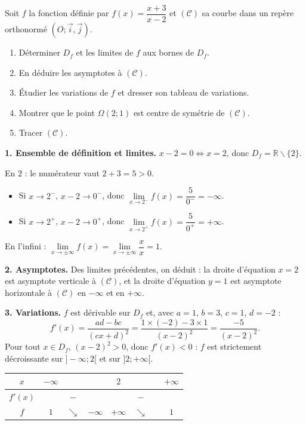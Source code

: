 \documentclass[11pt]{article}
\def\setminus{\mathbin{\backslash}}\let\smallsetminus\setminus
\begin{document}
\begin{exoresolu}
Soit $f$ la fonction définie par $f(x)=\dfrac{x+3}{x-2}$ et $(\mathcal{C})$ sa courbe dans un repère orthonormé $(O;\vec{i},\vec{j})$.
\begin{enumerate}
\item Déterminer $D_f$ et les limites de $f$ aux bornes de $D_f$.
\item En déduire les asymptotes à $(\mathcal{C})$.
\item Étudier les variations de $f$ et dresser son tableau de variations.
\item Montrer que le point $\Omega(2;1)$ est centre de symétrie de $(\mathcal{C})$.
\item Tracer $(\mathcal{C})$.
\end{enumerate}
\tcblower
\textbf{1. Ensemble de définition et limites.} $x-2=0\iff x=2$, donc $D_f=\mathbb{R}\setminus\{2\}$.

En $2$ : le numérateur vaut $2+3=5>0$.
\begin{itemize}
\item Si $x\to 2^-$, $x-2\to 0^-$, donc $\lim\limits_{x\to 2^-}f(x)=\dfrac{5}{0^-}=-\infty$.
\item Si $x\to 2^+$, $x-2\to 0^+$, donc $\lim\limits_{x\to 2^+}f(x)=\dfrac{5}{0^+}=+\infty$.
\end{itemize}
En l'infini : $\lim\limits_{x\to\pm\infty}f(x)=\lim\limits_{x\to\pm\infty}\dfrac{x}{x}=1$.

\textbf{2. Asymptotes.} Des limites précédentes, on déduit : la droite d'équation $x=2$ est asymptote verticale à $(\mathcal{C})$, et la droite d'équation $y=1$ est asymptote horizontale à $(\mathcal{C})$ en $-\infty$ et en $+\infty$.

\textbf{3. Variations.} $f$ est dérivable sur $D_f$ et, avec $a=1$, $b=3$, $c=1$, $d=-2$ :
\[f'(x)=\dfrac{ad-bc}{(cx+d)^2}=\dfrac{1\times(-2)-3\times 1}{(x-2)^2}=\dfrac{-5}{(x-2)^2}.\]
Pour tout $x\in D_f$, $(x-2)^2>0$, donc $f'(x)<0$ : $f$ est strictement décroissante sur $]-\infty;2[$ et sur $]2;+\infty[$.

\begin{center}
\begin{tabular}{|c|ccc||cccc|}\hline
$x$ & $-\infty$ & & & $2$ & & & $+\infty$ \\ \hline
$f'(x)$ & & $-$ & & & $-$ & & \\ \hline
$f$ & $1$ & $\searrow$ & $-\infty$ & $+\infty$ & $\searrow$ & & $1$ \\ \hline
\end{tabular}
\end{center}


\end{exoresolu}
\end{document}
